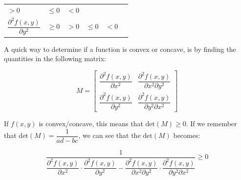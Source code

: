 \documentclass[11pt]{article}
\begin{document}
\begin{longtable}[]{@{}llllll@{}}
\begin{minipage}[t]{0.14\columnwidth}
\(>0\)\strut
\end{minipage} & \begin{minipage}[t]{0.14\columnwidth}\raggedright
\(\leq 0\)\strut
\end{minipage} & \begin{minipage}[t]{0.14\columnwidth}\raggedright
\(< 0\)\strut
\end{minipage} & \begin{minipage}[t]{0.14\columnwidth}\raggedright
\strut
\end{minipage}\tabularnewline
\begin{minipage}[t]{0.14\columnwidth}\raggedright
\(\dfrac{\partial^2 f(x,y)}{\partial y^2}\)\strut
\end{minipage} & \begin{minipage}[t]{0.14\columnwidth}\raggedright
\(\geq 0\)\strut
\end{minipage} & \begin{minipage}[t]{0.14\columnwidth}\raggedright
\(>0\)\strut
\end{minipage} & \begin{minipage}[t]{0.14\columnwidth}\raggedright
\(\leq 0\)\strut
\end{minipage} & \begin{minipage}[t]{0.14\columnwidth}\raggedright
\(< 0\)\strut
\end{minipage} & \begin{minipage}[t]{0.14\columnwidth}\raggedright
\strut
\end{minipage}\tabularnewline
\bottomrule
\end{longtable}

    A quick way to determine if a function is convex or concave, is by
finding the quantities in the following matrix:

\[ M = \begin{bmatrix} \dfrac{\partial^2 f(x,y)}{\partial x^2} & \dfrac{\partial^2 f(x,y)}{\partial x^2 \partial y^2} \\ \dfrac{\partial^2 f(x,y)}{\partial y^2} & \dfrac{\partial^2 f(x,y)}{\partial y^2 \partial x^2}  \end{bmatrix} \]

    If \(f(x,y)\) is convex/concave, this means that
\(\textrm{det}(M) \geq 0\). If we remember that
\(\text{det}(M) = \dfrac{1}{ad-bc}\), we can see that the
\(\textrm{det}(M)\) becomes:

\[ \dfrac{1}{\dfrac{\partial^2 f(x,y)}{\partial x^2} \cdot \dfrac{\partial^2 f(x,y)}{\partial y^2} - \dfrac{\partial^2 f(x,y)}{\partial x^2 \partial y^2} \cdot \dfrac{\partial^2 f(x,y)}{\partial y^2 \partial x^2} } \geq 0 \]
\end{document}
